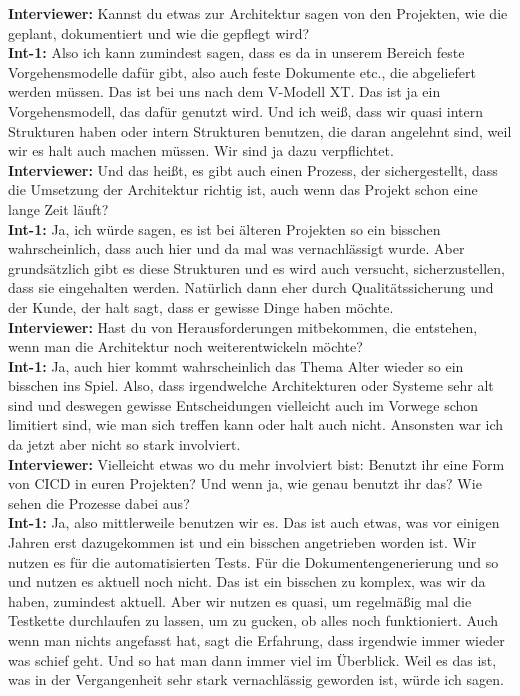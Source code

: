 \textbf{Interviewer:} Kannst du etwas zur Architektur sagen von den Projekten, wie die geplant, dokumentiert und wie die gepflegt wird?\\
\textbf{Int-1:} Also ich kann zumindest sagen, dass es da in unserem Bereich feste Vorgehensmodelle dafür gibt, also auch feste Dokumente etc., die abgeliefert werden müssen. Das ist bei uns nach dem V-Modell XT. Das ist ja ein Vorgehensmodell, das dafür genutzt wird. Und ich weiß, dass wir quasi intern Strukturen haben oder intern Strukturen benutzen, die daran angelehnt sind, weil wir es halt auch machen müssen. Wir sind ja dazu verpflichtet.\\
\textbf{Interviewer:} Und das heißt, es gibt auch einen Prozess, der sichergestellt, dass die Umsetzung der Architektur richtig ist, auch wenn das Projekt schon eine lange Zeit läuft?\\
\textbf{Int-1:} Ja, ich würde sagen, es ist bei älteren Projekten so ein bisschen wahrscheinlich, dass auch hier und da mal was vernachlässigt wurde. Aber grundsätzlich gibt es diese Strukturen und es wird auch versucht, sicherzustellen, dass sie eingehalten werden. Natürlich dann eher durch Qualitätssicherung und der Kunde, der halt sagt, dass er gewisse Dinge haben möchte.\\
\textbf{Interviewer:} Hast du von Herausforderungen mitbekommen, die entstehen, wenn man die Architektur noch weiterentwickeln möchte?\\
\textbf{Int-1:} Ja, auch hier kommt wahrscheinlich das Thema Alter wieder so ein bisschen ins Spiel. Also, dass irgendwelche Architekturen oder Systeme sehr alt sind und deswegen gewisse Entscheidungen vielleicht auch im Vorwege schon limitiert sind, wie man sich treffen kann oder halt auch nicht. Ansonsten war ich da jetzt aber nicht so stark involviert.\\
\textbf{Interviewer:} Vielleicht etwas wo du mehr involviert bist: Benutzt ihr eine Form von CICD in euren Projekten? Und wenn ja, wie genau benutzt ihr das? Wie sehen die Prozesse dabei aus?\\
\textbf{Int-1:} Ja, also mittlerweile benutzen wir es. Das ist auch etwas, was vor einigen Jahren erst dazugekommen ist und ein bisschen angetrieben worden ist. Wir nutzen es für die automatisierten Tests. Für die Dokumentengenerierung und so und nutzen es aktuell noch nicht. Das ist ein bisschen zu komplex, was wir da haben, zumindest aktuell. Aber wir nutzen es quasi, um regelmäßig mal die Testkette durchlaufen zu lassen, um zu gucken, ob alles noch funktioniert. Auch wenn man nichts angefasst hat, sagt die Erfahrung, dass irgendwie immer wieder was schief geht. Und so hat man dann immer viel im Überblick. Weil es das ist, was in der Vergangenheit sehr stark vernachlässig geworden ist, würde ich sagen.\\
